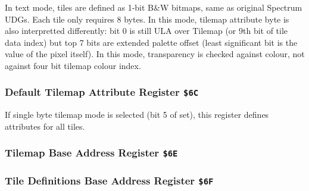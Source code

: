 In text mode, tiles are defined as 1-bit B\&W bitmaps, same as original Spectrum UDGs. Each tile only requires 8 bytes. In this mode, tilemap attribute byte is also interpretted differently: bit 0 is still ULA over Tilemap (or 9th bit of tile data index) but top 7 bits are extended palette offset (least significant bit is the value of the pixel itself). In this mode, transparency is checked against  colour, not against four bit tilemap colour index.


\subsubsection{Default Tilemap Attribute Register {\tt \$6C}}

If single byte tilemap mode is selected (bit 5 of  set), this register defines attributes for all tiles.

\begin{NextPort}
\end{NextPort}


\subsubsection{Tilemap Base Address Register {\tt \$6E}}

\begin{NextPort}
\end{NextPort}


\subsubsection{Tile Definitions Base Address Register {\tt \$6F}}

\begin{NextPort}
\end{NextPort}


\pagebreak
\IntentionallyEmpty
\pagebreak